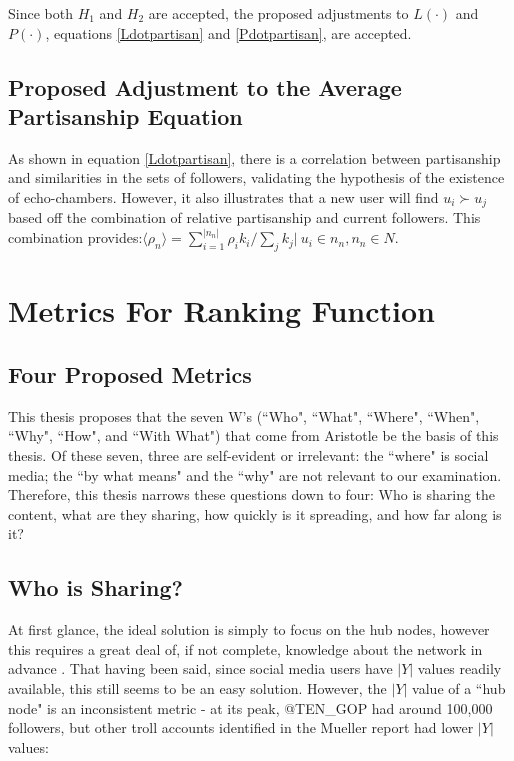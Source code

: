 \documentclass[preprint,review,12pt]{elsarticle}
\begin{document}
Since both $H_1$ and $H_2$ are accepted, the proposed adjustments to $L(\cdot)$ and $P(\cdot)$, equations \ref{Ldotpartisan} and \ref{Pdotpartisan}, are accepted.

\subsection{Proposed Adjustment to the Average Partisanship Equation}
As shown in equation \ref{Ldotpartisan}, there is a correlation between partisanship and similarities in the sets of followers, validating the hypothesis of the existence of echo-chambers. However, it also illustrates that a new user will find $u_i \succ u_j$ based off the combination of relative partisanship and current followers. This combination provides:$\langle \rho_n \rangle = \sum_{i=1}^{|n_n|}\rho_ik_i / \sum_{j}k_j | \ u_i \in n_n, n_n \in N$.


\section{Metrics For Ranking Function}
\subsection{Four Proposed Metrics}
This thesis proposes that the seven W's (``Who", ``What", ``Where", ``When", ``Why", ``How", and ``With What") that come from Aristotle \cite{sloan2010aristotle,aquinas1952thomas} be the basis of this thesis. Of these seven, three are self-evident or irrelevant: the ``where" is social media; the ``by what means" and the ``why" are not relevant to our examination. Therefore, this thesis narrows these questions down to four: Who is sharing the content, what are they sharing, how quickly is it spreading, and how far along is it?

\subsection{Who is Sharing?}
At first glance, the ideal solution is simply to focus on the hub nodes, however this requires a great deal of, if not complete, knowledge about the network in advance  \cite{dezsHo2002halting,pastor2002immunization}. That having been said, since social media users have $|Y|$ values readily available, this still seems to be an easy solution. However, the $|Y|$ value of a ``hub node" is an inconsistent metric - at its peak, @TEN\_GOP had around 100,000 followers, but other troll accounts identified in the Mueller report had lower $|Y|$ values:
\end{document}
